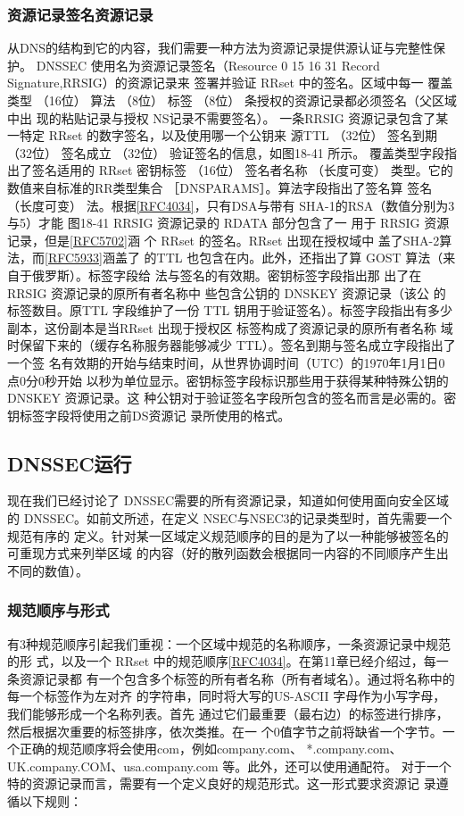 \subsubsection{资源记录签名资源记录}
从DNS的结构到它的内容，我们需要一种方法为资源记录提供源认证与完整性保护。
DNSSEC 使用名为资源记录签名（Resource
0
15 16
31
Record Signature,RRSIG）的资源记录来
签署并验证 RRset 中的签名。区域中每一
覆盖类型
（16位）
算法
（8位）
标签
（8位）
条授权的资源记录都必须签名（父区域中出
现的粘贴记录与授权 NS记录不需要签名）。
一条RRSIG 资源记录包含了某一特定
RRset 的数字签名，以及使用哪一个公钥来
源TTL
（32位）
签名到期
（32位）
签名成立
（32位）
验证签名的信息，如图18-41 所示。
覆盖类型字段指出了签名适用的 RRset
密钥标签
（16位）
签名者名称
（长度可变）
类型。它的数值来自标准的RR类型集合
［DNSPARAMS］。算法字段指出了签名算
签名
（长度可变）
法。根据\href{https://www.rfc-editor.org/rfc/rfc4034}{[RFC4034]}，只有DSA与带有
SHA-1的RSA（数值分别为3与5）才能
图18-41
RRSIG 资源记录的 RDATA 部分包含了一
用于 RRSIG 资源记录，但是\href{https://www.rfc-editor.org/rfc/rfc5702}{[RFC5702]}涵
个 RRset 的签名。RRset 出现在授权域中
盖了SHA-2算法，而\href{https://www.rfc-editor.org/rfc/rfc5933}{[RFC5933]}涵盖了
的TTL 也包含在内。此外，还指出了算
GOST 算法（来自于俄罗斯）。标签字段给
法与签名的有效期。密钥标签字段指出那
出了在 RRSIG 资源记录的原所有者名称中
些包含公钥的 DNSKEY 资源记录（该公
的标签数目。原TTL 字段维护了一份 TTL
钥用于验证签名）。标签字段指出有多少
副本，这份副本是当RRset 出现于授权区
标签构成了资源记录的原所有者名称
域时保留下来的（缓存名称服务器能够减少 TTL）。签名到期与签名成立字段指出了一个签
名有效期的开始与结束时间，从世界协调时间（UTC）的1970年1月1日0点0分0秒开始
以秒为单位显示。密钥标签字段标识那些用于获得某种特殊公钥的 DNSKEY 资源记录。这
种公钥对于验证签名字段所包含的签名而言是必需的。密钥标签字段将使用之前DS资源记
录所使用的格式。

\subsection{DNSSEC运行}
现在我们已经讨论了 DNSSEC需要的所有资源记录，知道如何使用面向安全区域的
DNSSEC。如前文所述，在定义 NSEC与NSEC3的记录类型时，首先需要一个规范有序的
定义。针对某一区域定义规范顺序的目的是为了以一种能够被签名的可重现方式来列举区域
的内容（好的散列函数会根据同一内容的不同顺序产生出不同的数值）。

\subsubsection{规范顺序与形式}
有3种规范顺序引起我们重视：一个区域中规范的名称顺序，一条资源记录中规范的形
式，以及一个 RRset 中的规范顺序\href{https://www.rfc-editor.org/rfc/rfc4034}{[RFC4034]}。在第11章已经介绍过，每一条资源记录都
有一个包含多个标签的所有者名称（所有者域名）。通过将名称中的每一个标签作为左对齐
的字符串，同时将大写的US-ASCII 字母作为小写字母，我们能够形成一个名称列表。首先
通过它们最重要（最右边）的标签进行排序，然后根据次重要的标签排序，依次类推。在一
个0值字节之前将缺省一个字节。一个正确的规范顺序将会使用com，例如company.com、
*.company.com、UK.company.COM、usa.company.com 等。此外，还可以使用通配符。
对于一个特的资源记录而言，需要有一个定义良好的规范形式。这一形式要求资源记
录遵循以下规则：

